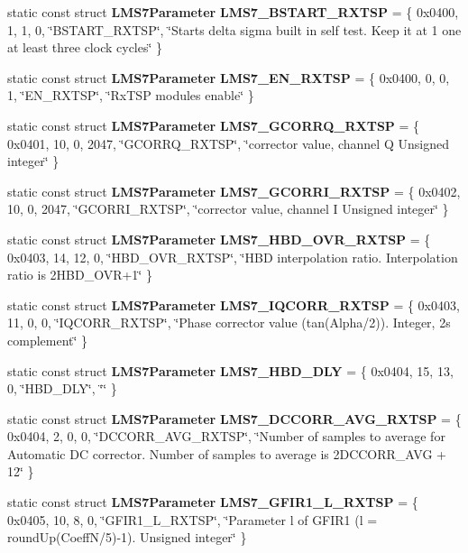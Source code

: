 \begin{DoxyCompactItemize}
static const struct {\bf L\+M\+S7\+Parameter} {\bf L\+M\+S7\+\_\+\+B\+S\+T\+A\+R\+T\+\_\+\+R\+X\+T\+SP} = \{ 0x0400, 1, 1, 0, \char`\"{}\+B\+S\+T\+A\+R\+T\+\_\+\+R\+X\+T\+S\+P\char`\"{}, \char`\"{}\+Starts delta sigma built in self test. Keep it at 1 one at least three clock cycles\char`\"{} \}
\item 
static const struct {\bf L\+M\+S7\+Parameter} {\bf L\+M\+S7\+\_\+\+E\+N\+\_\+\+R\+X\+T\+SP} = \{ 0x0400, 0, 0, 1, \char`\"{}\+E\+N\+\_\+\+R\+X\+T\+S\+P\char`\"{}, \char`\"{}\+Rx\+T\+S\+P modules enable\char`\"{} \}
\item 
static const struct {\bf L\+M\+S7\+Parameter} {\bf L\+M\+S7\+\_\+\+G\+C\+O\+R\+R\+Q\+\_\+\+R\+X\+T\+SP} = \{ 0x0401, 10, 0, 2047, \char`\"{}\+G\+C\+O\+R\+R\+Q\+\_\+\+R\+X\+T\+S\+P\char`\"{}, \char`\"{}corrector value, channel Q Unsigned integer\char`\"{} \}
\item 
static const struct {\bf L\+M\+S7\+Parameter} {\bf L\+M\+S7\+\_\+\+G\+C\+O\+R\+R\+I\+\_\+\+R\+X\+T\+SP} = \{ 0x0402, 10, 0, 2047, \char`\"{}\+G\+C\+O\+R\+R\+I\+\_\+\+R\+X\+T\+S\+P\char`\"{}, \char`\"{}corrector value, channel I Unsigned integer\char`\"{} \}
\item 
static const struct {\bf L\+M\+S7\+Parameter} {\bf L\+M\+S7\+\_\+\+H\+B\+D\+\_\+\+O\+V\+R\+\_\+\+R\+X\+T\+SP} = \{ 0x0403, 14, 12, 0, \char`\"{}\+H\+B\+D\+\_\+\+O\+V\+R\+\_\+\+R\+X\+T\+S\+P\char`\"{}, \char`\"{}\+H\+B\+D interpolation ratio. Interpolation ratio is 2\+H\+B\+D\+\_\+\+O\+V\+R+1\char`\"{} \}
\item 
static const struct {\bf L\+M\+S7\+Parameter} {\bf L\+M\+S7\+\_\+\+I\+Q\+C\+O\+R\+R\+\_\+\+R\+X\+T\+SP} = \{ 0x0403, 11, 0, 0, \char`\"{}\+I\+Q\+C\+O\+R\+R\+\_\+\+R\+X\+T\+S\+P\char`\"{}, \char`\"{}\+Phase corrector value (tan(\+Alpha/2)). Integer, 2\textquotesingle{}s complement\char`\"{} \}
\item 
static const struct {\bf L\+M\+S7\+Parameter} {\bf L\+M\+S7\+\_\+\+H\+B\+D\+\_\+\+D\+LY} = \{ 0x0404, 15, 13, 0, \char`\"{}\+H\+B\+D\+\_\+\+D\+L\+Y\char`\"{}, \char`\"{}\char`\"{} \}
\item 
static const struct {\bf L\+M\+S7\+Parameter} {\bf L\+M\+S7\+\_\+\+D\+C\+C\+O\+R\+R\+\_\+\+A\+V\+G\+\_\+\+R\+X\+T\+SP} = \{ 0x0404, 2, 0, 0, \char`\"{}\+D\+C\+C\+O\+R\+R\+\_\+\+A\+V\+G\+\_\+\+R\+X\+T\+S\+P\char`\"{}, \char`\"{}\+Number of samples to average for Automatic D\+C corrector. Number of samples to average is 2\+D\+C\+C\+O\+R\+R\+\_\+\+A\+V\+G + 12\char`\"{} \}
\item 
static const struct {\bf L\+M\+S7\+Parameter} {\bf L\+M\+S7\+\_\+\+G\+F\+I\+R1\+\_\+\+L\+\_\+\+R\+X\+T\+SP} = \{ 0x0405, 10, 8, 0, \char`\"{}\+G\+F\+I\+R1\+\_\+\+L\+\_\+\+R\+X\+T\+S\+P\char`\"{}, \char`\"{}\+Parameter l of G\+F\+I\+R1 (l = round\+Up(\+Coeff\+N/5)-\/1). Unsigned integer\char`\"{} \}

\end{DoxyCompactItemize}
